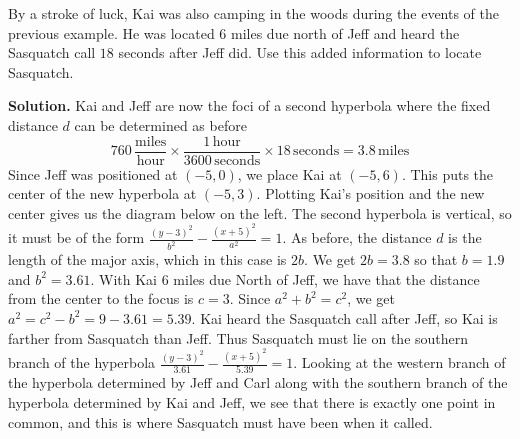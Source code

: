 \begin{ex}  \label{FindtheSasquatch} By a stroke of luck, Kai was also camping in the woods during the events of the previous example.  He was located $6$ miles due north of Jeff and heard the Sasquatch call $18$ seconds after Jeff did.  Use this added information to locate Sasquatch.

\medskip

{\bf Solution.} Kai and Jeff are now the foci of a second hyperbola where the fixed distance $d$ can be determined as before \[760 \, \dfrac{\mbox{miles}}{\mbox{hour}} \times \dfrac{ 1 \, \mbox{hour}}{ 3600 \, \mbox{seconds}} \times 18 \, \mbox{seconds}  = 3.8 \, \mbox{miles}\]  Since Jeff was positioned at $(-5, 0)$, we place Kai at $(-5, 6)$.  This puts the center of the new hyperbola at $(-5, 3)$.  Plotting Kai's position and the new center gives us the diagram below on the left. The second hyperbola is vertical, so it must be of the form $\frac{(y-3)^2}{b^2} - \frac{(x+5)^2}{a^2} = 1$.  As before, the distance $d$ is the length of the major axis, which in this case is $2b$.  We get $2b = 3.8$ so that $b = 1.9$ and $b^2 = 3.61$.  With Kai $6$ miles due North of Jeff, we have that the distance from the center to the focus is $c = 3$.  Since $a^2 + b^2 = c^2$, we get $a^2 = c^2 - b^2 = 9 - 3.61 = 5.39$.  Kai heard the Sasquatch call after Jeff, so Kai is farther from Sasquatch than Jeff.  Thus Sasquatch must lie on the southern branch of the hyperbola $\frac{(y-3)^2}{3.61} - \frac{(x+5)^2}{5.39} = 1$.  Looking at the western branch of the hyperbola determined by Jeff and Carl along with the southern branch of the hyperbola determined by Kai and Jeff, we see that there is exactly one point in common, and this is where Sasquatch must have been when it called.


\begin{center}


\end{center}
\end{ex}
